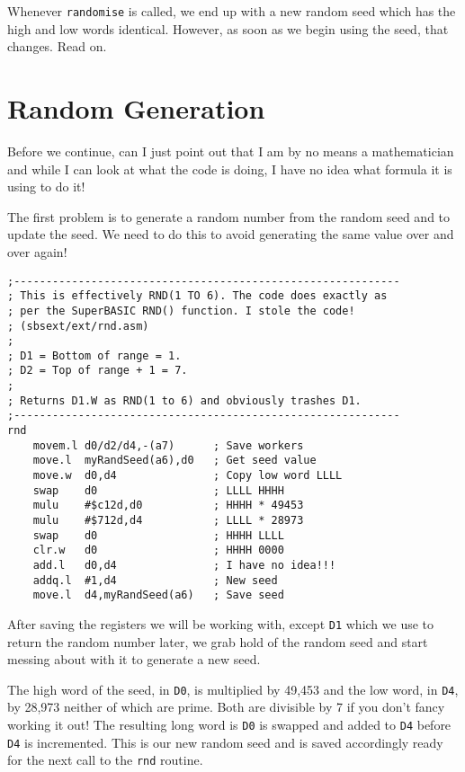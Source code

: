 Whenever \lstinline!randomise! is called, we end up with a new random
seed which has the high and low words identical. However, as soon
as we begin using the seed, that changes. Read on.

\section{Random Generation}

Before we continue, can I just point out that I am by no means a mathematician
and while I can look at what the code is doing, I have no idea what
formula it is using to do it! 

The first problem is to generate a random number from the random seed
and to update the seed. We need to do this to avoid generating the
same value over and over again!

\begin{lstlisting}[caption={Rnd 1 to 6 function - Part 1},firstnumber=49]
;------------------------------------------------------------
; This is effectively RND(1 TO 6). The code does exactly as
; per the SuperBASIC RND() function. I stole the code!
; (sbsext/ext/rnd.asm)
;
; D1 = Bottom of range = 1.
; D2 = Top of range + 1 = 7.
;
; Returns D1.W as RND(1 to 6) and obviously trashes D1.
;------------------------------------------------------------
rnd
    movem.l d0/d2/d4,-(a7)      ; Save workers
    move.l  myRandSeed(a6),d0   ; Get seed value
    move.w  d0,d4               ; Copy low word LLLL
    swap    d0                  ; LLLL HHHH
    mulu    #$c12d,d0           ; HHHH * 49453
    mulu    #$712d,d4           ; LLLL * 28973
    swap    d0                  ; HHHH LLLL
    clr.w   d0                  ; HHHH 0000
    add.l   d0,d4               ; I have no idea!!!
    addq.l  #1,d4               ; New seed
    move.l  d4,myRandSeed(a6)   ; Save seed

\end{lstlisting}

After saving the registers we will be working with, except \lstinline!D1!
which we use to return the random number later, we grab hold of the
random seed and start messing about with it to generate a new seed. 

The high word of the seed, in \lstinline!D0!, is multiplied by 49,453
and the low word, in \lstinline!D4!, by 28,973 neither of which are
prime. Both are divisible by 7 if you don't fancy working it out!
The resulting long word is \lstinline!D0! is swapped and added to
\lstinline!D4! before \lstinline!D4! is incremented. This is our
new random seed and is saved accordingly ready for the next call to
the \lstinline!rnd! routine.


